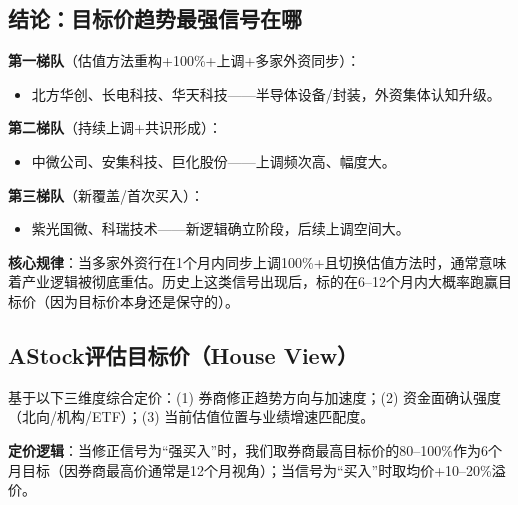\documentclass[a4paper,11pt,fontset=none]{ctexart}
\begin{document}
\subsection*{结论：目标价趋势最强信号在哪}

\textbf{第一梯队}（估值方法重构+100\%+上调+多家外资同步）：
\begin{itemize}
  \item 北方华创、长电科技、华天科技——半导体设备/封装，外资集体认知升级。
\end{itemize}

\textbf{第二梯队}（持续上调+共识形成）：
\begin{itemize}
  \item 中微公司、安集科技、巨化股份——上调频次高、幅度大。
\end{itemize}

\textbf{第三梯队}（新覆盖/首次买入）：
\begin{itemize}
  \item 紫光国微、科瑞技术——新逻辑确立阶段，后续上调空间大。
\end{itemize}

\textbf{核心规律}：当多家外资行在1个月内同步上调100\%+且切换估值方法时，通常意味着产业逻辑被彻底重估。历史上这类信号出现后，标的在6--12个月内大概率跑赢目标价（因为目标价本身还是保守的）。

\subsection*{AStock评估目标价（House View）}

基于以下三维度综合定价：(1) 券商修正趋势方向与加速度；(2) 资金面确认强度（北向/机构/ETF）；(3) 当前估值位置与业绩增速匹配度。

\textbf{定价逻辑}：当修正信号为``强买入''时，我们取券商最高目标价的80--100\%作为6个月目标（因券商最高价通常是12个月视角）；当信号为``买入''时取均价+10--20\%溢价。
\end{document}
